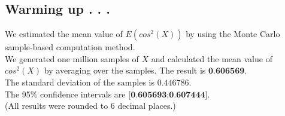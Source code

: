 \subsection{Warming up . . .}
We estimated the mean value of $E(cos^2(X))$ by using the Monte Carlo sample-based computation method.\\
We generated one million samples of $X$ and calculated the mean value of $cos^2(X)$ by averaging over the samples.
The result is $\textbf{0.606569}$.\\
The standard deviation of the samples is $0.446786$.\\
The 95\% confidence intervals are
$\textbf{[0.605693;0.607444]}$.\\
(All results were rounded to 6 decimal places.)
